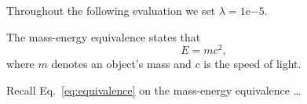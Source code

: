 Throughout the following evaluation we set $\lambda = 1\mathrm{e}{-5}$. 

The mass-energy equivalence states that
\begin{equation}
  E = m c^2,  \label{eq:equivalence}
\end{equation}
where $m$ denotes an object's mass and $c$ is the speed of light.

Recall Eq.~\eqref{eq:equivalence} on the mass-energy equivalence \dots

